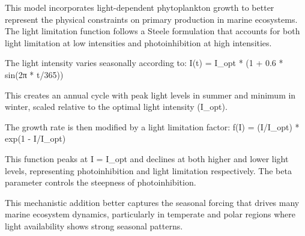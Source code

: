 This model incorporates light-dependent phytoplankton growth to better represent the physical constraints on primary production in marine ecosystems. The light limitation function follows a Steele formulation that accounts for both light limitation at low intensities and photoinhibition at high intensities.

The light intensity varies seasonally according to:
I(t) = I_opt * (1 + 0.6 * sin(2π * t/365))

This creates an annual cycle with peak light levels in summer and minimum in winter, scaled relative to the optimal light intensity (I_opt).

The growth rate is then modified by a light limitation factor:
f(I) = (I/I_opt) * exp(1 - I/I_opt)

This function peaks at I = I_opt and declines at both higher and lower light levels, representing photoinhibition and light limitation respectively. The beta parameter controls the steepness of photoinhibition.

This mechanistic addition better captures the seasonal forcing that drives many marine ecosystem dynamics, particularly in temperate and polar regions where light availability shows strong seasonal patterns.
